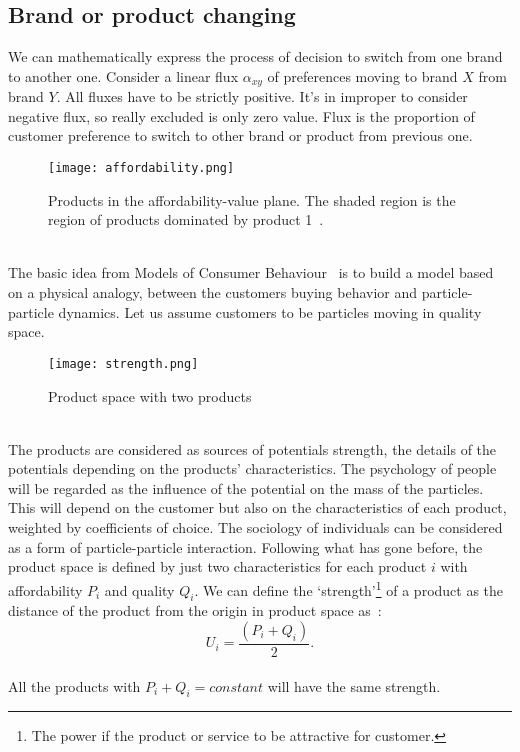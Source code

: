 \subsection{Brand or product changing} \label{subsec:brand}
We can mathematically express the process of decision to switch from one brand to another one.
Consider a linear flux $\alpha_{xy}$ of preferences moving to brand $X$ from brand $Y$.
All fluxes have to be strictly positive.
It's in improper to consider negative flux, so really excluded is only zero value.
Flux is the proportion of customer preference to switch to other brand or product from previous one.
\begin{figure}[h!]
	\begin{center}
		\texttt{[image: affordability.png]}
	\end{center}
	\caption{Products in the affordability-value plane.
	The shaded region is the region of products dominated by product 1~\cite{pantland}.}
	\label{Affordability of products}
\end{figure}
\\
The basic idea from Models of Consumer Behaviour~\cite{patel} is to build a model based on a physical analogy,
between the customers buying behavior and particle-particle dynamics.
Let us assume customers to be particles moving in quality space.\\
\begin{figure}[h!]
	\begin{center}
		\texttt{[image: strength.png]}
	\end{center}
	\caption{Product space with two products~\cite{patel}}
	\label{Strength of products}
\end{figure}
\\
The products are considered as sources of  potentials strength, the details of the potentials depending on the products’ characteristics.
The psychology of people will be regarded as the influence of the potential on the mass of the particles.
This will depend on the customer but also on the characteristics of each product, weighted by coefficients of choice.
The sociology of individuals can be considered as a form of particle-particle interaction. Following what has gone before,
the product space is defined by just two characteristics for each product $i$ with affordability $P_i$ and quality $Q_i$.
We can define the ‘strength’\footnote{The power if the product or service to be attractive for customer.} of a product as
the distance of the product from the origin in product space as~\cite{pantland}:
\\
\begin{equation} \label{eq:10}
U_i = \frac{(P_i + Q_i)}{2}.
\end{equation}
\\
All the products with $P_i + Q_i = constant$ will have the same strength.
